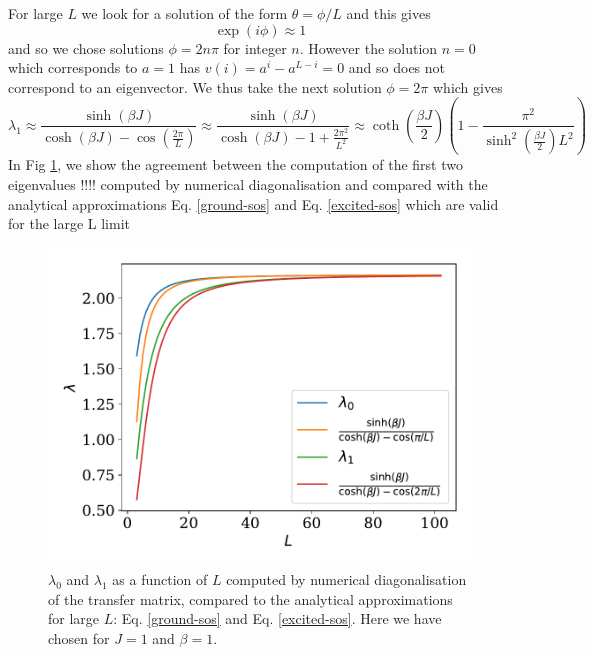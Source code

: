 For large $L$ we look for a solution of the form $\theta=\phi/L$ and this gives
\begin{equation}
\exp(i\phi) \approx 1
\end{equation}
and so we chose solutions $\phi = 2n\pi$ for integer $n$. However the solution $n=0$ which corresponds to $a=1$ has $v(i) = a^i-a^{L-i} =0$ and so does not correspond to an eigenvector. We thus take the next solution $\phi = 2\pi$ which gives
\begin{equation}
\lambda_1 \approx \frac{\sinh(\beta J)}{\cosh(\beta J) - \cos(\frac{2\pi}{L})} \approx \frac{\sinh(\beta J)}{\cosh(\beta J) - 1+ \frac{2\pi^2}{L^2}}\approx \coth(\frac{\beta J}{2})(1 - \frac{\pi^2}{\sinh^2(\frac{\beta J}{2}) L^2})
\label{excited-sos}
\end{equation}
In Fig \ref{large-l-limit}, we show the agreement between the computation of the first two eigenvalues !!!! computed by numerical diagonalisation and compared with the analytical approximations Eq. \eqref{ground-sos} and Eq. \eqref{excited-sos} which are valid for the large L limit
\begin{figure}
\centering
\includegraphics[width=0.7\linewidth]{finite-size/null_deanJ.pdf}
\caption{$\lambda_0$ and $\lambda_1$ as a function of $L$ computed by numerical diagonalisation of the transfer matrix, compared to the analytical approximations for large $L$: Eq. \eqref{ground-sos} and Eq. \eqref{excited-sos}. Here we have chosen  for $J=1$ and $\beta=1$.}
\label{large-l-limit} 
\end{figure}

